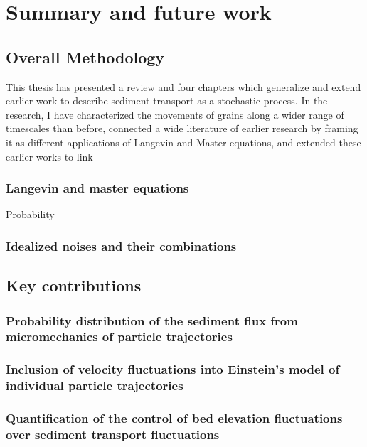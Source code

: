 
\chapter{Summary and future work}
\label{ch:conc}
\section{Overall Methodology}

This thesis has presented a review and four chapters which generalize and extend earlier work to describe sediment transport as a stochastic process. In the research, I have characterized the movements of grains along a wider range of timescales than before, connected a wide literature of earlier research by framing it as different applications of Langevin and Master equations, and extended these earlier works to link  



\subsection{Langevin and master equations}

Probability 


\subsection{Idealized noises and their combinations}


\section{Key contributions}

\subsection{Probability distribution of the sediment flux from micromechanics of particle trajectories}

\subsection{Inclusion of velocity fluctuations into Einstein's model of individual particle trajectories}


\subsection{Quantification of the control of bed elevation fluctuations over sediment transport fluctuations}


